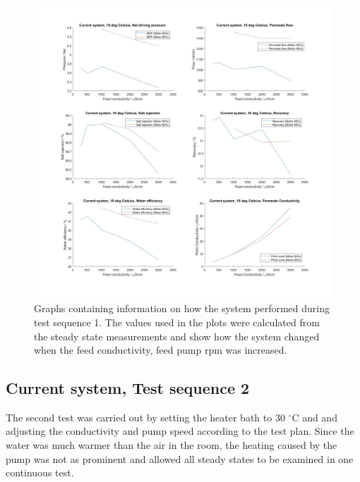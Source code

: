 \begin{figure}[H]
    \centering
    \includegraphics[width=1\textwidth]{Key20}
    \caption{Graphs containing information on how the system performed during test sequence 1. The values used in the plots were calculated from the steady state measurements and show how the system changed when the feed conductivity, feed pump rpm was increased.}
    \label{fig:K20}
\end{figure}

\newpage

\subsection{Current system, Test sequence 2}

The second test was carried out by setting the heater bath to 30 $^{\circ}$C and and adjusting the conductivity and pump speed according to the test plan. Since the water was much warmer than the air in the room, the heating caused by the pump was not as prominent and allowed all steady states to be examined in one continuous test. 

